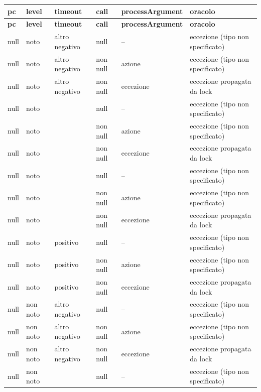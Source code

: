 {\footnotesize\setlength{\tabcolsep}{3pt}
\begin{longtable}{>{\raggedright\arraybackslash}p{}>{\raggedright\arraybackslash}p{}>{\raggedright\arraybackslash}p{}>{\raggedright\arraybackslash}p{}>{\raggedright\arraybackslash}p{}>{\raggedright\arraybackslash}p{}}
\toprule
\textbf{pc} & \textbf{level} & \textbf{timeout} & \textbf{call} & \textbf{processArgument} & \textbf{oracolo} \\
\midrule
\endfirsthead
\toprule
\textbf{pc} & \textbf{level} & \textbf{timeout} & \textbf{call} & \textbf{processArgument} & \textbf{oracolo} \\
\midrule
\endhead
\bottomrule
\endfoot
null & noto & altro negativo & null & -- & eccezione (tipo non specificato) \\
null & noto & altro negativo & non null & azione & eccezione (tipo non specificato) \\
null & noto & altro negativo & non null & eccezione & eccezione propagata da lock \\
null & noto & -1 & null & -- & eccezione (tipo non specificato) \\
null & noto & -1 & non null & azione & eccezione (tipo non specificato) \\
null & noto & -1 & non null & eccezione & eccezione propagata da lock \\
null & noto & 0 & null & -- & eccezione (tipo non specificato) \\
null & noto & 0 & non null & azione & eccezione (tipo non specificato) \\
null & noto & 0 & non null & eccezione & eccezione propagata da lock \\
null & noto & positivo & null & -- & eccezione (tipo non specificato) \\
null & noto & positivo & non null & azione & eccezione (tipo non specificato) \\
null & noto & positivo & non null & eccezione & eccezione propagata da lock \\
null & non noto & altro negativo & null & -- & eccezione (tipo non specificato) \\
null & non noto & altro negativo & non null & azione & eccezione (tipo non specificato) \\
null & non noto & altro negativo & non null & eccezione & eccezione propagata da lock \\
null & non noto & -1 & null & -- & eccezione (tipo non specificato) \\

\end{longtable}}
